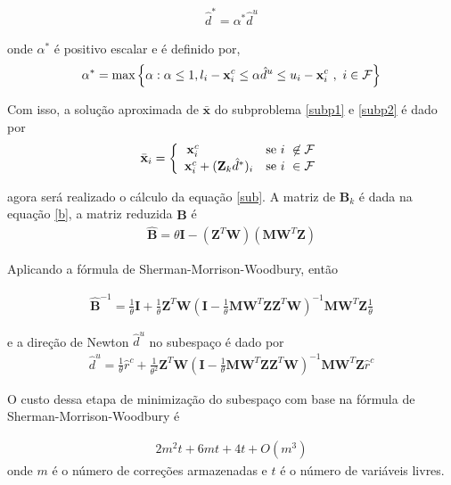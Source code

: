           \begin{eqnarray}
           \hat{d}^{*} = \alpha^{*} \hat{d}^{u}
          \end{eqnarray}

          onde $\alpha^{*}$ é positivo escalar e é definido por,
          \begin{eqnarray}
           \alpha^{*} = \hbox{max} \left \{ \alpha : \alpha \le 1, l_{i}-\mathbf{x}^{c}_{i} \le \alpha \hat{d}^{u} \le u_{i} - \mathbf{x}^{c}_{i}~,~ i \in \mathcal{F} \right \}
          \end{eqnarray}

          Com isso, a solução aproximada de $\bar{\mathbf{x}}$ do subproblema \ref{subp1} e \ref{subp2} é dado por
          \begin{eqnarray}
            \bar{\mathbf{x}}_{i}  = \left\{ \begin{array}{rll}
           {\mathbf{x}_{i}^{c}} ~~~~~~~~~~~~~  &{\hbox{se}~ i~ \not\in \mathcal{F}} \\
           {\mathbf{x}_{i}^{c} + (\mathbf{Z}_{k} \hat{d}^{*})_{i}}     & {\hbox{se}~i~\in \mathcal{F}}
          \end{array} \right.
          \end{eqnarray}

          agora será realizado o cálculo da equação \ref{sub}. A matriz de $\mathbf{B}_{k}$ é dada na equação \ref{b}, a matriz reduzida $\hat{\mathbf{B}}$ é 
          \begin{eqnarray}
           \hat{\mathbf{B}}=\theta \mathbf{I}-\left(\mathbf{Z}^{T} \mathbf{W}\right)\left(\mathbf{M} \mathbf{W}^{T} \mathbf{Z}\right)
          \end{eqnarray}

          Aplicando a fórmula de Sherman-Morrison-Woodbury, então
          
          \begin{eqnarray}
           \hat{\mathbf{B}}^{-1}=\frac{1}{\theta} \mathbf{I}+\frac{1}{\theta} \mathbf{Z}^{T} \mathbf{W}\left(\mathbf{I}-\frac{1}{\theta} \mathbf{M} \mathbf{W}^{T} \mathbf{Z} \mathbf{Z}^{T} \mathbf{W}\right)^{-1} \mathbf{M} \mathbf{W}^{T} \mathbf{Z} \frac{1}{\theta}
          \end{eqnarray}

          e a direção de Newton $\hat{d}^{u}$ no subespaço é dado por
          \begin{eqnarray}
           \hat{d}^{u}=\frac{1}{\theta} \hat{r}^{c}+\frac{1}{\theta^{2}} \mathbf{Z}^{T} \mathbf{W}\left(\mathbf{I}-\frac{1}{\theta} \mathbf{M} \mathbf{W}^{T} \mathbf{Z} \mathbf{Z}^{T} \mathbf{W}\right)^{-1} \mathbf{M} \mathbf{W}^{T} \mathbf{Z} \hat{r}^{c}
          \end{eqnarray}
          
          O custo dessa etapa de minimização do subespaço com base na fórmula de Sherman-Morrison-Woodbury é
          
          \begin{eqnarray}
           2m^{2}t + 6mt  +4 t + O(m^{3})
          \end{eqnarray}
          onde $m$ é o número de correções armazenadas e $t$ é o número de variáveis livres.
          